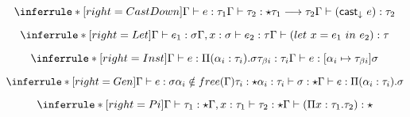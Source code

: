 \[
\inferrule*[right=CastDown]
{\judge e : \tau_1 \\ \judge \tau_2 : \star \\ \tau_1 \longrightarrow \tau_2} {\judge (\mathsf{cast}_\downarrow\ e) : \tau_2}
\]

\[
\inferrule*[right=Let]
{\judge e_1 : \sigma \\ \Gamma,x: \sigma \vdash e_2: \tau} {\judge ( let\ x = e_1\ in\ e_2 ) : \tau }
\]


\[
\inferrule*[right=Inst]
{\judge e : \Pi (\alpha_i : \tau_i). \sigma \\ \tau_{\beta i}: \tau_i }
{\judge e : [\alpha_i \mapsto \tau_{\beta i}]\sigma }
\]

\[
\inferrule*[right=Gen]
{\judge e : \sigma \\
\alpha_i \notin free(\Gamma) \\
\tau_i : \star \\
\alpha_i : \tau_i \vdash \sigma : \star}
{\judge e : \Pi(\alpha_i : \tau_i). \sigma }
\]

\framebox{$ \judge \sigma : \star$ }

\[
\inferrule*[right=Pi]
{\judge \tau_1 : \star \\ \Gamma, x:\tau_1 \vdash \tau_2 : \star} {\judge (\Pi x : \tau_1. \tau_2) : \star}
\]



